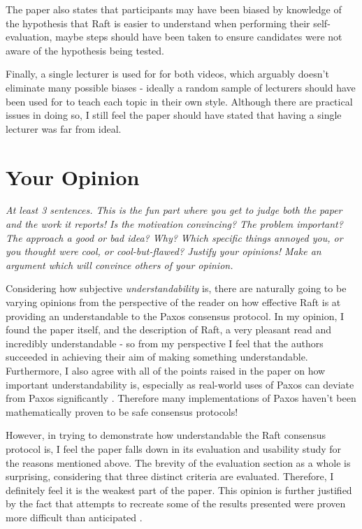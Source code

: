 \documentclass[11pt]{article}
\begin{document}
The paper also states that participants may have been biased by knowledge of
the hypothesis that Raft is easier to understand when performing their
self-evaluation, maybe steps should have been taken to ensure candidates were
not aware of the hypothesis being tested.

Finally, a single lecturer is used for for both videos, which arguably doesn't
eliminate many possible biases - ideally a random sample of lecturers should
have been used for to teach each topic in their own style. Although there are
practical issues in doing so, I still feel the paper should have stated that
having a single lecturer was far from ideal.


\section*{Your Opinion}

\textsl{At least 3 sentences. This is the fun part where you get to judge both
the paper and the work it reports! Is the motivation convincing? The problem
important? The approach a good or bad idea? Why? Which specific things annoyed
you, or you thought were cool, or cool-but-flawed? Justify your opinions! Make
an argument which will convince others of your opinion.}

Considering how subjective \textit{understandability} is, there are naturally
going to be varying opinions from the perspective of the reader on how
effective Raft is at providing an understandable to the Paxos consensus
protocol. In my opinion, I found the paper itself, and the description of Raft,
a very pleasant read and incredibly understandable - so from my perspective I
feel that the authors succeeded in achieving their aim of making something
understandable. Furthermore, I also agree with all of the points raised in the
paper on how important understandability is, especially as real-world uses of
Paxos can deviate from Paxos significantly \cite{Chubby} \cite{ZooKeeper}.
Therefore many implementations of Paxos haven't been mathematically proven to
be safe consensus protocols!

However, in trying to demonstrate how understandable the Raft consensus
protocol is, I feel the paper falls down in its evaluation and usability study
for the reasons mentioned above. The brevity of the evaluation section as a
whole is surprising, considering that three distinct criteria are evaluated.
Therefore, I definitely feel it is the weakest part of the paper. This opinion
is further justified by the fact that attempts to recreate some of the results
presented were proven more difficult than anticipated \cite{RaftRefloated}.
\end{document}
